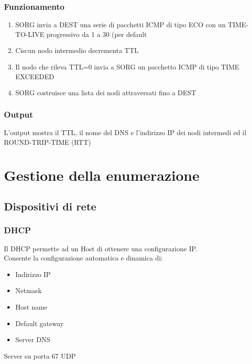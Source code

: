 \documentclass{report}
\begin{document}
            \subsection{Funzionamento}
                    \begin{enumerate}
                        \item SORG invia a DEST una serie di pacchetti ICMP di tipo ECO con un TIME-TO-LIVE progressivo da 1 a 30 (per default
                        \item Ciscun nodo intermedio decrementa TTL
                        \item Il nodo che rileva TTL=0 invia a SORG un pacchetto ICMP di tipo TIME EXCEEDED
                        \item SORG costruisce una lista dei nodi attraversati fino a DEST
                    \end{enumerate}
                \subsection{Output}
                    L'output mostra il TTL, il nome del DNS e l'indirizzo IP dei nodi intermedi ed il ROUND-TRIP-TIME (RTT)
    \chapter{Gestione della enumerazione}   
        \section{Dispositivi di rete}
            \subsection{DHCP}
                Il DHCP permette ad un Host di ottenere una configurazione IP.
                \\
                Consente la configurazione automatica e dinamica di:
                \begin{itemize}
                    \item Indirizzo IP
                    \item Netmask
                    \item Host name
                    \item Default gateway
                    \item Server DNS
                \end{itemize}
                Server su porta 67 UDP
\end{document}

